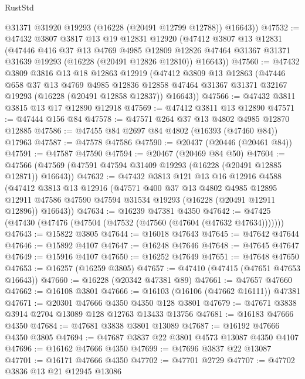 \begin{lexlean}{RustStd}
\begin{coremodule}
        @31371
        @31920
        @19293
        (@16228 (@20491 @12799 @12788))
        @16643))
@47532 := @47432
    @3807
    @3817
    @13
    @19
    @12831
    @12920
    (@47412
      @3807
      @13
      @12831
      (@47446
        @416
        @37
        @13
        @4769
        @4985
        @12809
        @12826
        @47464
        @31367
        @31371
        @31639
        @19293
        (@16228 (@20491 @12826 @12810))
        @16643))
@47560 := @47432
    @3809
    @3816
    @13
    @18
    @12863
    @12919
    (@47412
      @3809
      @13
      @12863
      (@47446
        @658
        @37
        @13
        @4769
        @4985
        @12836
        @12858
        @47464
        @31367
        @31371
        @32167
        @19293
        (@16228 (@20491 @12858 @12837))
        @16643))
@47566 := @47432 @3811 @3815 @13 @17 @12890 @12918
@47569 := @47412 @3811 @13 @12890
@47571 := @47444 @156 @84
@47578 := @47571 @264 @37 @13 @4802 @4985 @12870 @12885
@47586 := @47455 @84 @2697 @84 @4802 (@16393 (@47460 @84)) @17963
@47587 := @47578 @47586
@47590 := @20437 (@20446 (@20461 @84))
@47591 := @47587 @47590
@47594 := @20467 (@20469 @84 @50)
@47604 := @47566 (@47569 (@47591 @47594 @31409 @19293 (@16228 (@20491 @12885 @12871)) @16643))
@47632 := @47432
    @3813
    @121
    @13
    @16
    @12916
    @4588
    (@47412
      @3813
      @13
      @12916
      (@47571
        @400
        @37
        @13
        @4802
        @4985
        @12895
        @12911
        @47586
        @47590
        @47594
        @31534
        @19293
        (@16228 (@20491 @12911 @12896))
        @16643))
@47634 := @16239 @47381 @4350
@47642 := @47425 (@47430 (@47476 (@47504 (@47532 (@47560 (@47604 (@47632 @47634)))))))
@47643 := @15822 @3805
@47644 := @16018 @47643
@47645 := @47642 @47644
@47646 := @15892 @4107
@47647 := @16248 @47646
@47648 := @47645 @47647
@47649 := @15916 @4107
@47650 := @16252 @47649
@47651 := @47648 @47650
@47653 := @16257 (@16259 @3805)
@47657 := @47410 (@47415 (@47651 @47653 @16643))
@47660 := @16228 (@20342 @47381 @89)
@47661 := @47657 @47660
@47662 := @16108 @3801
@47666 := @16103 (@16106 (@47662 @16111)) @47381
@47671 := @20301 @47666 @4350 @4350 @128 @3801
@47679 := @47671 @3838 @3914 @2704 @13089 @128 @12763 @13433 @13756
@47681 := @16183 @47666 @4350
@47684 := @47681 @3838 @3801 @13089
@47687 := @16192 @47666 @4350 @3805
@47694 := @47687 @3837 @22 @3801 @4573 @13087 @4350 @4107
@47696 := @16162 @47666 @4350
@47699 := @47696 @3837 @22 @13087
@47701 := @16171 @47666 @4350
@47702 := @47701 @2729
@47707 := @47702 @3836 @13 @21 @12945 @13086

\end{coremodule}
\end{lexlean}
